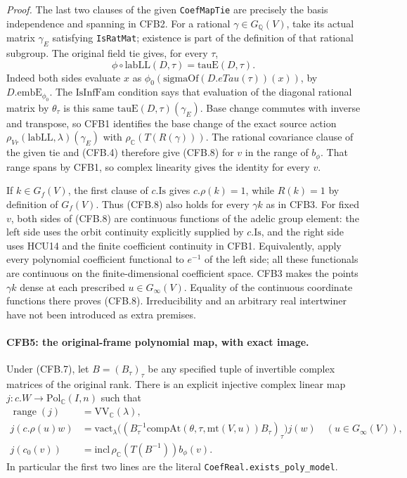 \emph{Proof.}
The last two clauses of the given \texttt{CoefMapTie} are precisely
the basis independence and spanning in CFB2.  For a rational
\(\gamma\in G_{\mathbb Q}(V)\), take its actual matrix
\(\gamma_E\) satisfying \texttt{IsRatMat}; existence is part of
the definition of that rational subgroup.  The original field tie
gives, for every \(\tau\),
\[
        \phi\circ\mathrm{labLL}(D,\tau)
                           =\mathrm{tauE}(D,\tau).             \tag{CFB.9}
\]
Indeed both sides evaluate \(x\) as
\(\phi_0(\mathrm{sigmaOf}(D.eTau(\tau))(x))\), by
\(D.\mathrm{embE}_{\phi_0}\).
The \(\mathrm{IsInfFam}\) condition says that evaluation of the
diagonal rational matrix by \(\theta_\tau\) is this same
\(\mathrm{tauE}(D,\tau)(\gamma_E)\).
Base change commutes with inverse and transpose, so CFB1 identifies
the base change of the exact source action
\(\rho_{Vr}(\mathrm{labLL},\lambda)(\gamma_E)\) with
\(\rho_{\mathbb C}(T(R(\gamma)))\).
The rational covariance clause of the given tie and (CFB.4)
therefore give (CFB.8) for \(v\) in the range of \(b_\phi\).
That range spans by CFB1, so complex linearity gives the identity
for every \(v\).

If \(k\in G_f(V)\), the first clause of \(c.\mathrm{Is}\)
gives \(c.\rho(k)=1\), while \(R(k)=1\) by definition of
\(G_f(V)\).  Thus (CFB.8) also holds for every \(\gamma k\)
as in CFB3.  For fixed \(v\), both sides of (CFB.8) are continuous
functions of the adelic group element: the left side uses the orbit
continuity explicitly supplied by \(c.\mathrm{Is}\), and the right
side uses HCU14 and the finite coefficient continuity in CFB1.
Equivalently, apply every polynomial coefficient functional to
\(e^{-1}\) of the left side; all these functionals are continuous
on the finite-dimensional coefficient space.  CFB3 makes the points
\(\gamma k\) dense at each prescribed \(u\in G_\infty(V)\).
Equality of the continuous coordinate functions there proves
(CFB.8).  Irreducibility and an arbitrary real intertwiner have not
been introduced as extra premises.

\paragraph{CFB5: the original-frame polynomial map, with exact image.}
\label{claim:CFB5}
Under (CFB.7), let \(B=(B_\tau)_\tau\) be any specified tuple of
invertible complex matrices of the original rank.  There is an
explicit injective complex linear map
\(j:c.W\to\mathrm{Pol}_{\mathbb C}(I,n)\) such that
\[
 \begin{split}
 \operatorname{range}(j)&=\mathrm{VV}_{\mathbb C}(\lambda),\\
 j(c.\rho(u)w)&=
   \mathrm{vact}_\lambda\bigl((B_\tau^{-1}
          \mathrm{compAt}(\theta,\tau,\mathrm{mt}(V,u))
                    B_\tau)_\tau\bigr)j(w)
       \quad(u\in G_\infty(V)),\\
 j(c_0(v))&=\mathrm{incl}\,
       \rho_{\mathbb C}(T(B^{-1}))b_\phi(v).
 \end{split}                                                    \tag{CFB.10}
\]
In particular the first two lines are the literal
\texttt{CoefReal.exists\_poly\_model}.

